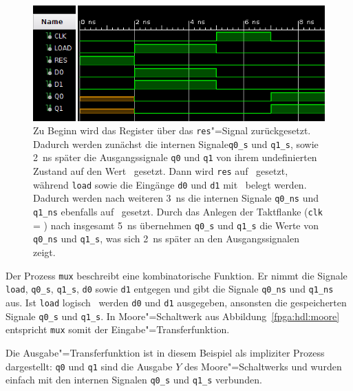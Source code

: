 \begin{figure}[htb]
    \centering
    \includegraphics[width=\textwidth]{reg2_waveform.png}
    \caption[Verhalten des 2-Bit-Registers]{Zu Beginn wird das Register über
             das \texttt{res}"=Signal zurückgesetzt. Dadurch werden zunächst die
             internen Signale\texttt{q0\_s} und \texttt{q1\_s}, sowie
             \SI{2}{\nano\second} später die Ausgangssignale \texttt{q0} und
             \texttt{q1} von ihrem undefinierten Zustand auf den Wert
             \grqq\ gesetzt. Dann wird \texttt{res} auf \grqq\
             gesetzt, während \texttt{load} sowie die Eingänge \texttt{d0} und
             \texttt{d1} mit \glqq 1\grqq\ belegt werden. Dadurch werden nach
             weiteren \SI{3}{\nano\second} die internen Signale \texttt{q0\_ns}
             und \texttt{q1\_ns} ebenfalls auf \grqq\ gesetzt. Durch das
             Anlegen der Taktflanke (\texttt{clk} = \glqq 1\grqq) nach insgesamt
             \SI{5}{\nano\second} übernehmen \texttt{q0\_s} und \texttt{q1\_s}
             die Werte von \texttt{q0\_ns} und \texttt{q1\_s}, was sich
             \SI{2}{\nano\second} später an den Ausgangssignalen zeigt.}
    \label{fpga:hdl:waveform}
\end{figure}

Der Prozess \texttt{mux} beschreibt eine kombinatorische Funktion. Er
nimmt die Signale \texttt{load}, \texttt{q0\_s}, \texttt{q1\_s},
\texttt{d0} sowie \texttt{d1} entgegen und gibt die Signale \texttt{q0\_ns} und
\texttt{q1\_ns} aus. Ist \texttt{load} logisch \glqq 1\grqq\, werden \texttt{d0}
und \texttt{d1} ausgegeben, ansonsten die gespeicherten Signale \texttt{q0\_s}
und \texttt{q1\_s}. In Moore"=Schaltwerk aus Abbildung~\ref{fpga:hdl:moore}
entspricht \texttt{mux} somit der Eingabe"=Transferfunktion.
\cite[vgl.][31]{kesel2013}

Die Ausgabe"=Transferfunktion ist in diesem Beispiel als impliziter Prozess
dargestellt: \texttt{q0} und \texttt{q1} sind die Ausgabe $Y$ des
Moore"=Schaltwerks und wurden einfach mit den internen Signalen \texttt{q0\_s}
und \texttt{q1\_s} verbunden.
\cite[vgl.][31]{kesel2013}

